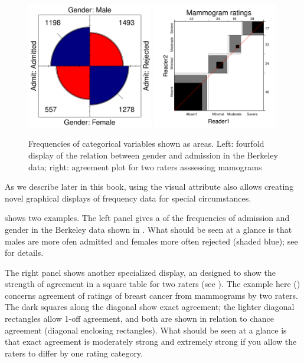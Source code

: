 \documentclass[11pt]{book}
\begin{document}
\begin{figure}
  \centering
  \includegraphics[width=0.49\textwidth]{ch01/fig/berk-fourfold3}
  \includegraphics[width=0.49\textwidth]{ch01/fig/mammograms1}
  \caption{Frequencies of categorical variables shown as areas. Left: fourfold display of the relation between gender and admission in the Berkeley data; right: agreement plot for two raters asssessing mamograms }
  \label{fig:area-diagrams}
\end{figure}

As we describe later in this book, using the visual attribute
also allows creating novel graphical displays of frequency data 
for special circumstances.

 shows two examples.  
The left panel gives a  of the frequencies 
of admission and gender in the Berkeley data shown in 
. 
What should be seen at a glance is that males are more ofen admitted
and females more often rejected (shaded blue); see 
for details.

The right panel shows another specialized display, an 
designed to show the strength of agreement in a square table for two raters
(see ).  The example here ()
concerns agreement of ratings of breast cancer from mammograms by two raters.
The dark squares along the diagonal show exact agreement; the lighter diagonal
rectangles allow 1-off agreement, and both are shown in relation to chance
agreement (diagonal enclosing rectangles).  What should be seen at a glance
is that exact agreement is moderately strong and extremely strong if you allow
the raters to differ by one rating category.
\end{document}
